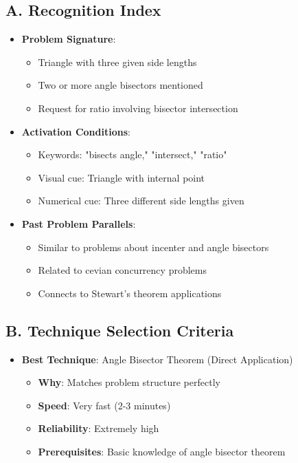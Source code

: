 \documentclass[12pt]{article}
\begin{document}
\begin{conversionbox}
\subsection*{A. Recognition Index}
\begin{itemize}[leftmargin=*]
    \item \textbf{Problem Signature}: 
    \begin{itemize}
        \item Triangle with three given side lengths
        \item Two or more angle bisectors mentioned
        \item Request for ratio involving bisector intersection
    \end{itemize}
    
    \item \textbf{Activation Conditions}:
    \begin{itemize}
        \item Keywords: "bisects angle," "intersect," "ratio"
        \item Visual cue: Triangle with internal point
        \item Numerical cue: Three different side lengths given
    \end{itemize}
    
    \item \textbf{Past Problem Parallels}:
    \begin{itemize}
        \item Similar to problems about incenter and angle bisectors
        \item Related to cevian concurrency problems
        \item Connects to Stewart's theorem applications
    \end{itemize}
\end{itemize}

\subsection*{B. Technique Selection Criteria}
\begin{itemize}[leftmargin=*]
    \item \textbf{Best Technique}: Angle Bisector Theorem (Direct Application)
    \begin{itemize}
        \item \textbf{Why}: Matches problem structure perfectly
        \item \textbf{Speed}: Very fast (2-3 minutes)
        \item \textbf{Reliability}: Extremely high
        \item \textbf{Prerequisites}: Basic knowledge of angle bisector theorem
    \end{itemize}
    

\end{itemize}
\end{conversionbox}
\end{document}
